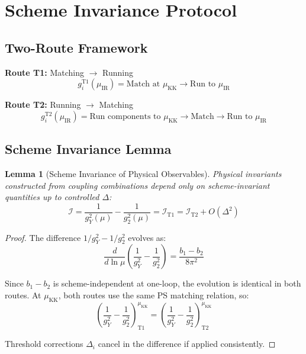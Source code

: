 \documentclass[11pt,a4paper]{article}
\newtheorem{lemma}{Lemma}[section]
\begin{document}
\section{Scheme Invariance Protocol}
\label{sec:scheme-invariance}

\subsection{Two-Route Framework}
\label{subsec:two-route}

\textbf{Route T1:} Matching $\to$ Running
\begin{equation}
\label{eq:route-t1}
g_i^{\text{T1}}(\mu_{\text{IR}}) = \text{Match at } \mu_{\text{KK}} \to \text{Run to } \mu_{\text{IR}}
\end{equation}

\textbf{Route T2:} Running $\to$ Matching
\begin{equation}
\label{eq:route-t2}
g_i^{\text{T2}}(\mu_{\text{IR}}) = \text{Run components to } \mu_{\text{KK}} \to \text{Match} \to \text{Run to } \mu_{\text{IR}}
\end{equation}

\subsection{Scheme Invariance Lemma}
\label{subsec:scheme-lemma}

\begin{lemma}[Scheme Invariance of Physical Observables]
\label{lem:scheme-invariance}
Physical invariants constructed from coupling combinations depend only on
scheme-invariant quantities up to controlled $\Delta$:
\begin{equation}
\label{eq:scheme-invariant-combo}
\mathcal{I} = \frac{1}{g_Y^2(\mu)} - \frac{1}{g_2^2(\mu)} = \mathcal{I}_{\text{T1}} = \mathcal{I}_{\text{T2}} + O(\Delta^2)
\end{equation}
\end{lemma}

\begin{proof}
The difference $1/g_Y^2 - 1/g_2^2$ evolves as:
\begin{equation}
\label{eq:diff-evolution}
\frac{d}{d\ln\mu}\left(\frac{1}{g_Y^2} - \frac{1}{g_2^2}\right) = \frac{b_1 - b_2}{8\pi^2}
\end{equation}

Since $b_1 - b_2$ is scheme-independent at one-loop, the evolution is identical in both routes.
At $\mu_{\text{KK}}$, both routes use the same PS matching relation, so:
\begin{equation}
\label{eq:boundary-agree}
\left(\frac{1}{g_Y^2} - \frac{1}{g_2^2}\right)_{\text{T1}}^{\mu_{\text{KK}}} = \left(\frac{1}{g_Y^2} - \frac{1}{g_2^2}\right)_{\text{T2}}^{\mu_{\text{KK}}}
\end{equation}

Threshold corrections $\Delta_i$ cancel in the difference if applied consistently.
\end{proof}
\end{document}
